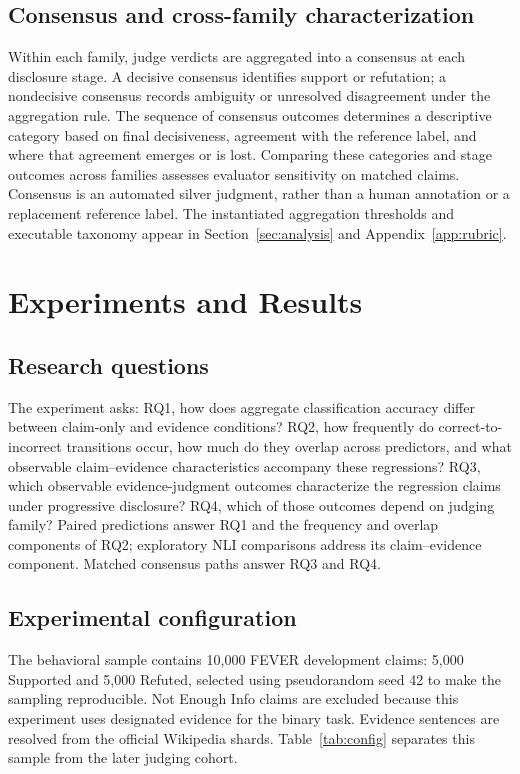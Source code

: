 \documentclass[11pt,letterpaper]{article}
\begin{document}
\subsection{Consensus and cross-family characterization}
Within each family, judge verdicts are aggregated into a consensus at each disclosure stage. A decisive consensus identifies support or refutation; a nondecisive consensus records ambiguity or unresolved disagreement under the aggregation rule. The sequence of consensus outcomes determines a descriptive category based on final decisiveness, agreement with the reference label, and where that agreement emerges or is lost. Comparing these categories and stage outcomes across families assesses evaluator sensitivity on matched claims. Consensus is an automated silver judgment, rather than a human annotation or a replacement reference label. The instantiated aggregation thresholds and executable taxonomy appear in Section~\ref{sec:analysis} and Appendix~\ref{app:rubric}.

\section{Experiments and Results}\label{sec:results}
\subsection{Research questions}
The experiment asks: RQ1, how does aggregate classification accuracy differ between claim-only and evidence conditions? RQ2, how frequently do correct-to-incorrect transitions occur, how much do they overlap across predictors, and what observable claim--evidence characteristics accompany these regressions? RQ3, which observable evidence-judgment outcomes characterize the regression claims under progressive disclosure? RQ4, which of those outcomes depend on judging family? Paired predictions answer RQ1 and the frequency and overlap components of RQ2; exploratory NLI comparisons address its claim--evidence component. Matched consensus paths answer RQ3 and RQ4.

\subsection{Experimental configuration}\label{sec:setup}
The behavioral sample contains 10,000 FEVER development claims: 5,000 Supported and 5,000 Refuted, selected using pseudorandom seed 42 to make the sampling reproducible. Not Enough Info claims are excluded because this experiment uses designated evidence for the binary task. Evidence sentences are resolved from the official Wikipedia shards. Table~\ref{tab:config} separates this sample from the later judging cohort.
\end{document}
